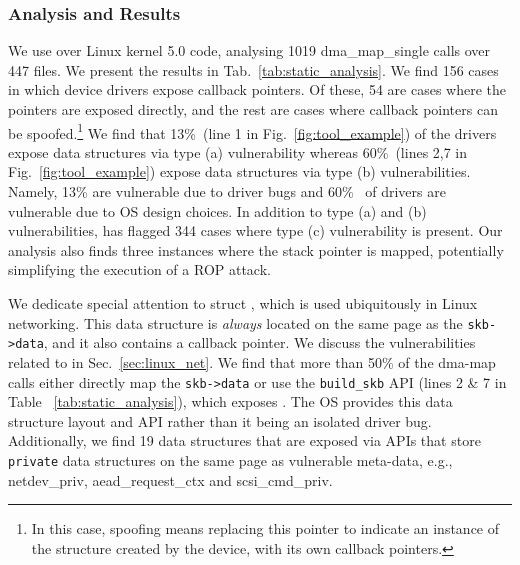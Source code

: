 \subsubsection{Analysis and Results}
We use \tool over Linux kernel 5.0 code,
analysing 1019 dma\_map\_single calls over 447 files. We present the results in Tab.~\ref{tab:static_analysis}. 
We find 156 cases in which device drivers expose callback pointers. Of these, 54 are cases where the pointers are exposed directly, and the rest are cases where callback pointers can be spoofed.\footnote{In this case, spoofing means replacing this pointer to indicate an instance of the structure created by the device, with its own callback pointers.}
We find that 13\%~(line 1 in Fig.~\ref{fig:tool_example}) of the drivers expose data structures via type (a) vulnerability whereas 60\%~(lines 2,7 in Fig.~\ref{fig:tool_example}) expose data structures via type (b) vulnerabilities. Namely, 13\% are vulnerable due to driver bugs and 60\%~ of drivers are vulnerable due to OS design choices. In addition to type (a) and (b) vulnerabilities, \tool has flagged 344 cases where type (c) vulnerability is present. Our analysis also finds three instances where the stack pointer is mapped, potentially simplifying the execution of a ROP attack.

We dedicate special attention to struct \shinfo, which is used ubiquitously in Linux networking. This data structure is \textit{always} located on the same page as the \texttt{skb->data}, and it also contains a callback pointer. We discuss the vulnerabilities related to \shinfo in Sec.~\ref{sec:linux_net}. We find that more than 50\% of the dma-map calls either directly map the \texttt{skb->data} or use the \texttt{build\_skb} API (lines 2 \& 7 in Table ~\ref{tab:static_analysis}), which exposes \shinfo. The OS provides this data structure layout and API rather than it being an isolated driver bug. Additionally, we find 19 data structures that are exposed via APIs that store \texttt{private} data structures on the same page as vulnerable meta-data, e.g., netdev\_priv, aead\_request\_ctx and scsi\_cmd\_priv.





